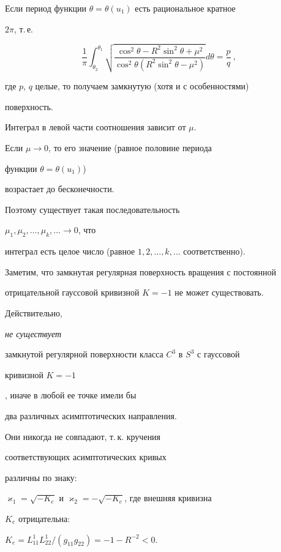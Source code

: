 Если период функции $\theta=\theta(u_1)$ есть рациональное кратное


$2\pi$, т.\,е.


\begin{equation} \label{integral p/q}


\frac{1}{\pi} \int_{\theta_2}^{\theta_1} \sqrt{\frac{\cos^2\theta-


R^2 \sin^2\theta + \mu^2}{\cos^2\theta(R^2 \sin^2\theta-\mu^2)}}


d\theta = \frac{p}{q} \ ,


\end{equation}


где $p$, $q$ целые, то получаем замкнутую (хотя и с особенностями)


поверхность.


Интеграл в левой части соотношения  зависит от $\mu$.


Если $\mu\rightarrow 0$, то его значение (равное половине периода


функции $\theta=\theta(u_1)$)


возрастает до бесконечности.


Поэтому существует такая последовательность


$\mu_1, \mu_2, \dotsc,\mu_k,\dotsc \rightarrow 0$, что


интеграл  есть целое число (равное $1,2,\dotsc,


k,\dotsc$ соответственно).


Заметим, что замкнутая регулярная поверхность вращения с постоянной


отрицательной гауссовой кривизной $K=-1$ не может существовать.


Действительно, {\it не существует


замкнутой регулярной поверхности класса $C^3$ в $S^3$ с гауссовой


кривизной $K=-1$}, иначе в любой ее точке имели бы


два различных асимптотических направления.


Они никогда не совпадают, т.\,к. кручения


соответствующих асимптотических кривых


различны по знаку:


$\varkappa_1 = \sqrt{-K_e}$ и $\varkappa_2 = -\sqrt{-K_e}$, где внешняя кривизна


$K_e$ отрицательна:


$K_e = L_{11}^1 L_{22}^1 / (g_{11} g_{22}) = - 1 - R^{-2} < 0$.


